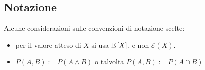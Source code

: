 \subsection*{Notazione}
Alcune considerazioni sulle convenzioni di notazione scelte:
\begin{itemize}
	\item per il valore atteso di $X$ si usa $\mathbb{E}\left[ X \right]$, e non $\mathcal{E}(X)$.
	\item $P(A,B):=P(A\land B)$ o talvolta $P(A,B):=P(A\cap B)$
\end{itemize}

